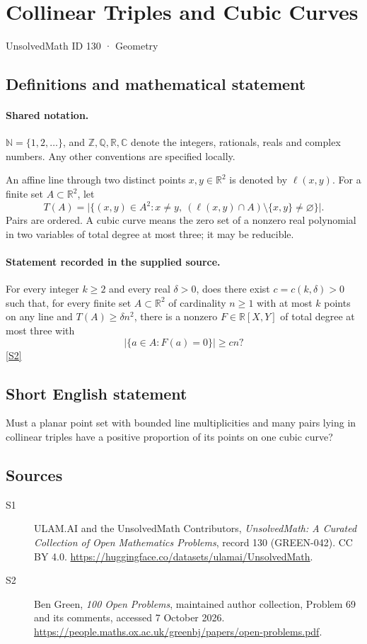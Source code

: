 \documentclass[11pt]{article}
\newcommand{\sref}[2]{\hyperlink{source:#1:#2}{[S#2]}}
\begin{document}
\setcounter{section}{129}
\section{Collinear Triples and Cubic Curves}\label{130}
{\small\sffamily UnsolvedMath ID 130 · Geometry}
\subsection{Definitions and mathematical statement}

\paragraph{Shared notation.}$\mathbb N=\{1,2,\ldots\}$, and $\mathbb Z,\mathbb Q,\mathbb R,\mathbb C$ denote the integers, rationals, reals and complex numbers. Any other conventions are specified locally.


An affine line through two distinct points $x,y\in\mathbb R^2$ is denoted by $\ell(x,y)$. For a finite set $A\subset\mathbb R^2$, let
\[
 T(A)=\bigl|\{(x,y)\in A^2:x\ne y,\ (\ell(x,y)\cap A)\setminus\{x,y\}\ne\varnothing\}\bigr|.
\]
Pairs are ordered. A cubic curve means the zero set of a nonzero real polynomial in two variables of total degree at most three; it may be reducible.
\paragraph{Statement recorded in the supplied source.}
For every integer $k\geq2$ and every real $\delta>0$, does there exist $c=c(k,\delta)>0$ such that, for every finite set $A\subset\mathbb R^2$ of cardinality $n\geq1$ with at most $k$ points on any line and $T(A)\geq\delta n^2$, there is a nonzero $F\in\mathbb R[X,Y]$ of total degree at most three with
\[
 |\{a\in A:F(a)=0\}|\geq cn?
\] \sref{130}{2}
\subsection{Short English statement}
Must a planar point set with bounded line multiplicities and many pairs lying in collinear triples have a positive proportion of its points on one cubic curve?
\subsection{Sources}
\begin{description}
\item[\hypertarget{source:130:1}{S1}] ULAM.AI and the UnsolvedMath Contributors, \emph{UnsolvedMath: A Curated Collection of Open Mathematics Problems}, record 130 (GREEN-042). CC BY 4.0. \url{https://huggingface.co/datasets/ulamai/UnsolvedMath}.
\item[\hypertarget{source:130:2}{S2}] Ben Green, \emph{100 Open Problems}, maintained author collection, Problem 69 and its comments, accessed 7 October 2026. \url{https://people.maths.ox.ac.uk/greenbj/papers/open-problems.pdf}.
\end{description}
\label{end:130}
\end{document}
